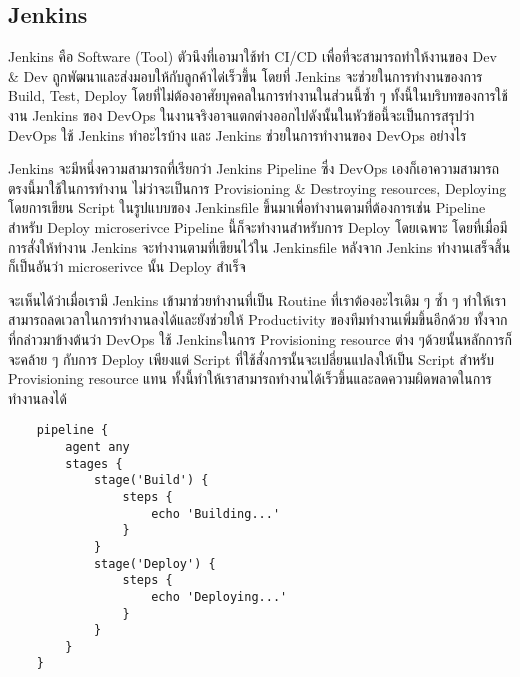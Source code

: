 \subsection{Jenkins}
Jenkins คือ Software (Tool) ตัวนึงที่เอามาใช้ทำ CI/CD \cite{cicd} เพื่อที่จะสามารถทำให้งานของ Dev \& Dev
ถูกพัฒนาและส่งมอบให้กับลูกค้าได่เร็วขึ้น โดยที่ Jenkins จะช่วยในการทำงานของการ Build, Test, Deploy โดยที่ไม่ต้องอาศัยบุคคลในการทำงานในส่วนนี้ซ้ำ ๆ 
ทั้งนี้ในบริบทของการใช้งาน Jenkins ของ DevOps ในงานจริงอาจแตกต่างออกไปดังนั้นในหัวข้อนี้จะเป็นการสรุปว่า
DevOps ใช้ Jenkins ทำอะไรบ้าง และ Jenkins ช่วยในการทำงานของ DevOps อย่างไร

Jenkins จะมีหนึ่งความสามารถที่เรียกว่า Jenkins Pipeline ซึ่ง DevOps เองก็เอาความสามารถตรงนี้มาใช้ในการทำงาน
ไม่ว่าจะเป็นการ Provisioning \& Destroying resources, Deploying โดยการเขียน Script ในรูปแบบของ Jenkinsfile
ขึ้นมาเพื่อทำงานตามที่ต้องการเช่น Pipeline สำหรับ Deploy microserivce Pipeline นี้ก็จะทำงานสำหรับการ Deploy โดยเฉพาะ
โดยที่เมื่อมีการสั่งให้ทำงาน Jenkins จะทำงานตามที่เขียนไว้ใน Jenkinsfile หลังจาก Jenkins ทำงานเสร็จสิ้นก็เป็นอันว่า microserivce นั้น Deploy สำเร็จ

จะเห็นได้ว่าเมื่อเรามี Jenkins เข้ามาช่วยทำงานที่เป็น Routine ที่เราต้องอะไรเดิม ๆ ซ้ำ ๆ ทำให้เราสามารถลดเวลาในการทำงานลงได้และยังช่วยให้
Productivity ของทีมทำงานเพิ่มขึ้นอีกด้วย ทั้งจากที่กล่าวมาข้างต้นว่า DevOps ใช้ Jenkinsในการ Provisioning resource ต่าง ๆด้วยนั้นหลักการก็จะคล้าย ๆ กับการ Deploy
เพียงแต่ Script ที่ใช้สั่งการนั้นจะเปลี่ยนแปลงให้เป็น Script สำหรับ Provisioning resource แทน ทั้งนี้ทำให้เราสามารถทำงานได้เร็วขึ้นและลดความผิดพลาดในการทำงานลงได้

\begin{verbatim}
    pipeline {
        agent any
        stages {
            stage('Build') {
                steps {
                    echo 'Building...'
                }
            }
            stage('Deploy') {
                steps {
                    echo 'Deploying...'
                }
            }
        }
    }
\end{verbatim}
